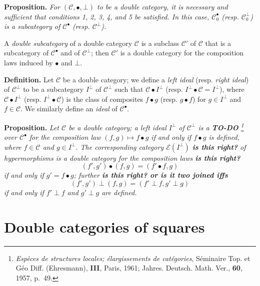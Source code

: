 \documentclass{article}
\newenvironment{itenv}[1]
  {\phantomsection\par\medskip\noindent\textbf{#1.}\itshape}
  {\par\medskip}
\newenvironment{rmenv}[1]
  {\phantomsection\par\medskip\noindent\textbf{#1.}\rmfamily}
  {\par\medskip}
\newcommand{\oldpage}[1]{\marginpar{\footnotesize$\Big\vert$ \textit{p.~#1}}}
\newcommand{\todo}{{\color{purple}\textbf{TO-DO }}}
\newcommand{\unsure}[1]{{\color{purple}\textbf{#1}}}
\newcommand{\CC}{\mathcal{C}}
\newcommand{\dotc}{{\mathbin{\bullet}}}
\newcommand{\botc}{{\mathbin{\bot}}}
\begin{document}
\begin{itenv}{Proposition}
  For $(\CC,\dotc,\botc)$ to be a double category, it is necessary and sufficient that conditions 1, 2, 3\textquotesingle, 4\textquotesingle, and 5 be satisfied.
  In this case, $\CC_0^\dotc$ (resp. $\CC_0^\botc$) is a subcategory of $\CC^\dotc$ (resp. $\CC^\botc$).
\end{itenv}

A \emph{double subcategory} of a double category $\CC$ is a subclass $\CC'$ of $\CC$ that is a subcategory of $\CC^\dotc$ and of $\CC^\botc$;
then $\CC'$ is a double category for the composition laws induced by $\dotc$ and $\botc$.

\begin{rmenv}{Definition}
  Let $\CC$ be a double category;
  we define a \emph{left ideal} (resp. \emph{right ideal}) of $\CC^\botc$ to be a subcategory $I^\botc$ of $\CC^\botc$ such that $\CC\dotc I^\botc$ (resp. $I^\botc\dotc\CC=I^\botc$), where $\CC\dotc I^\botc$ (resp. $I^\botc\dotc\CC$) is the class of composites $f\dotc g$ (resp. $g\dotc f$) for $g\in I^\botc$ and $f\in\CC$.
  We similarly define an \emph{ideal} of $\CC^\dotc$.
\end{rmenv}

\oldpage{2}

\begin{itenv}{Proposition}
  Let $\CC$ be a double category;
  a left ideal $I^\botc$ of $\CC^\botc$ is a \todo\footnote{\label{fn1}\emph{Espèces de structures locales; élargissements de catégories}, Séminaire Top. et Géo Diff. (Ehresmann), \textbf{III}, Paris, 1961; Jahres. Deutsch. Math. Ver., \textbf{60}, 1957, p.~49.} over $\CC^\dotc$ for the composition law $(f,g)\mapsto f\dotc g$ if and only if $f\dotc g$ is defined, where $f\in\CC$ and $g\in I^\botc$.
  The corresponding category $\mathcal{E}(I^\botc)$ \unsure{is this right?} of hypermorphisms is a double category for the composition laws \unsure{is this right?}
  \[
    (f',g')\dotc(f,g)
    = (f'\dotc f,g)
  \]
  if and only if $g'=f\dotc g$; further \unsure{is this right? or is it two joined iffs}
  \[
    (f',g')\botc(f,g)
    = (f'\botc f,g'\botc g)
  \]
  if and only if $f'\botc f$ and $g'\botc g$ are defined.
\end{itenv}


\section{Double categories of squares}
\end{document}
